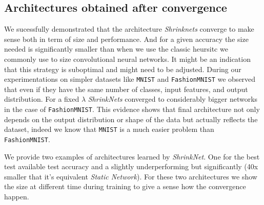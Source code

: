 \subsection{Architectures obtained after convergence}

We sucessfully demonstrated that the architecture \textit{Shrinknets} converge
to make sense both in term of size and performance. And for a given accuracy
the size needed is significantly smaller than when we use the classic heursitc
we commonly use to size convolutional neural networks. It might be an
indication that this strategy is suboptimal and might need to be adjusted.
During our experimentations on simpler datasets like \texttt{MNIST}
\cite{Lecun1998} and \texttt{FashionMNIST} \cite{Xiao2017} we observed that
even if they have the same number of classes, input features, and output
distribution. For a fixed $\lambda$ \textit{ShrinkNets} converged to
considerably bigger networks in the case of \texttt{FashionMNIST}. This
evidence shows that final architecture not only depends on the output
distribution or shape of the data but actually reflects the dataset, indeed we
know that \texttt{MNIST} is a much easier problem than \texttt{FashionMNIST}.

We provide two examples of architectures learned by \textit{ShrinkNet}. One
for the best test available test accuracy and a slightly underperforming but
significantly (40x smaller that it's equivalent \textit{Static Network}). For
these two architectures we show the size at different time during training to
give a sense how the convergence happen.


% 
% 
% 
